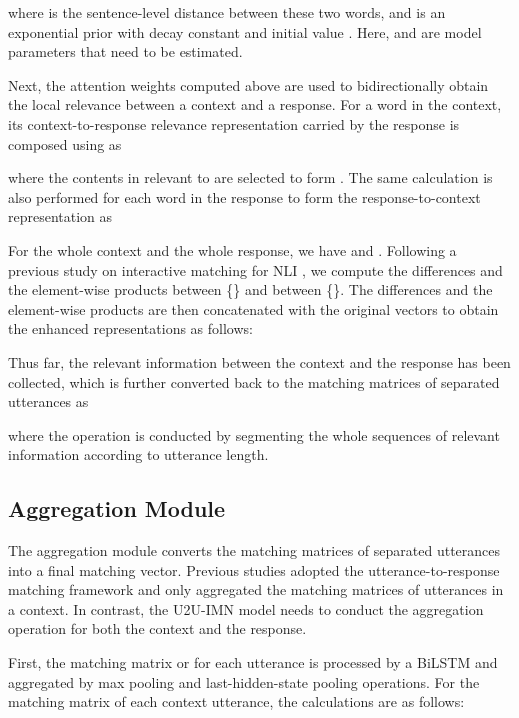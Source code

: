 \documentclass[journal]{IEEEtran}
\begin{document}
    where  is the sentence-level distance between these two words, and
     is an exponential prior with decay constant  and initial value . Here,  and  are model parameters that need to be estimated.

    Next, the attention weights  computed above are used to bidirectionally obtain the local relevance between a context and a response.
    For a word in the context, its context-to-response relevance representation carried by the response is composed using  as
    
    where the contents in  relevant to  are selected to form .
    The same calculation is also performed for each word in the response to form the response-to-context representation as
    
    For the whole context and the whole response, we have  and  .
    Following a previous study on interactive matching for NLI \cite{DBLP:conf/acl/ChenZLWJI17}, we compute the differences and the element-wise products between \{\} and between \{\}. The differences and the element-wise products are then concatenated with the original vectors to obtain the enhanced representations as follows:
    

    Thus far, the relevant information between the context and the response has been collected, which is further converted back to the matching matrices of separated utterances as
    
    where the  operation is conducted by segmenting the whole sequences of relevant information according to utterance length.

  \subsection{Aggregation Module} \label{sec5}
    The aggregation module converts the matching matrices of separated utterances into a final matching vector.
    Previous studies  \cite{DBLP:conf/acl/WuWXZL17,DBLP:conf/acl/WuLCZDYZL18,DBLP:conf/coling/ZhangLZZL18} adopted the utterance-to-response matching framework and only aggregated the matching matrices of utterances in a context.
    In contrast, the U2U-IMN model needs to conduct the aggregation operation for both the context and the response.

    First, the matching matrix  or  for each utterance is processed by a BiLSTM and aggregated by max pooling and last-hidden-state pooling operations. For the matching matrix  of each context utterance, the calculations are as follows:
    
\end{document}
